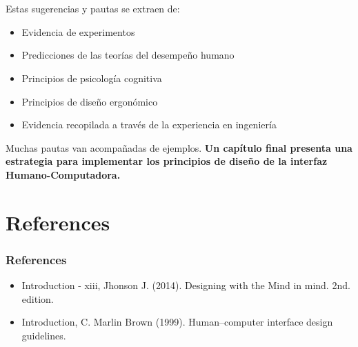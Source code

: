 \documentclass[11pt]{beamer}
\begin{document}
\section{}
\begin{frame}
Estas sugerencias y pautas se extraen de: 
\begin{itemize}
\item Evidencia de experimentos
\item Predicciones de las teorías del desempeño humano
\item Principios de psicología cognitiva
\item Principios de diseño ergonómico
\item Evidencia recopilada a través de la experiencia en ingeniería
\end{itemize}

\justifying \vspace{5mm} Muchas pautas van acompañadas de ejemplos. {\bf Un capítulo final presenta una estrategia para implementar los principios de diseño de la interfaz Humano-Computadora.}

\end{frame}


\section{References}
\begin{frame}
\frametitle{References}
\begin{itemize}
\item Introduction - xiii, Jhonson J. (2014). Designing with the Mind in mind. 2nd. edition.
\item Introduction, C. Marlin Brown (1999). Human–computer interface design guidelines.
\end{itemize}
\end{frame}
\end{document}
